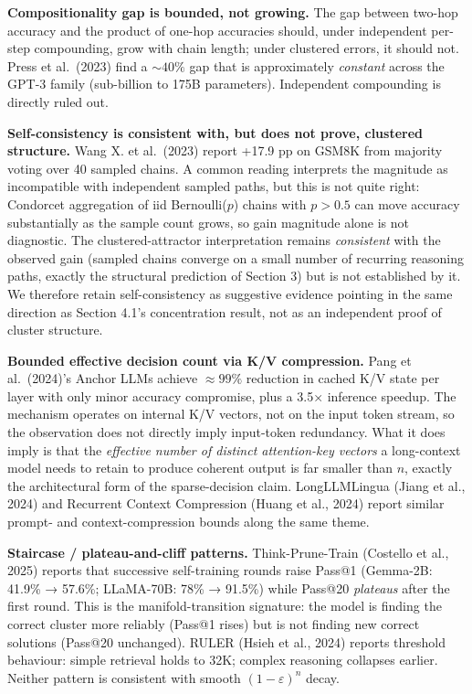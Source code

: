 \documentclass[
]{article}
\begin{document}
\textbf{Compositionality gap is bounded, not growing.} The gap between
two-hop accuracy and the product of one-hop accuracies should, under
independent per-step compounding, grow with chain length; under
clustered errors, it should not. Press et al.~(2023) find a
\(\sim 40\%\) gap that is approximately \emph{constant} across the GPT-3
family (sub-billion to 175B parameters). Independent compounding is
directly ruled out.

\textbf{Self-consistency is consistent with, but does not prove,
clustered structure.} Wang X. et al.~(2023) report +17.9 pp on GSM8K
from majority voting over 40 sampled chains. A common reading interprets
the magnitude as incompatible with independent sampled paths, but this
is not quite right: Condorcet aggregation of iid Bernoulli(\(p\)) chains
with \(p > 0.5\) can move accuracy substantially as the sample count
grows, so gain magnitude alone is not diagnostic. The
clustered-attractor interpretation remains \emph{consistent} with the
observed gain (sampled chains converge on a small number of recurring
reasoning paths, exactly the structural prediction of Section 3) but is
not established by it. We therefore retain self-consistency as
suggestive evidence pointing in the same direction as Section 4.1's
concentration result, not as an independent proof of cluster structure.

\textbf{Bounded effective decision count via K/V compression.} Pang et
al.~(2024)'s Anchor LLMs achieve \(\approx 99\%\) reduction in cached
K/V state per layer with only minor accuracy compromise, plus a 3.5×
inference speedup. The mechanism operates on internal K/V vectors, not
on the input token stream, so the observation does not directly imply
input-token redundancy. What it does imply is that the \emph{effective
number of distinct attention-key vectors} a long-context model needs to
retain to produce coherent output is far smaller than \(n\), exactly the
architectural form of the sparse-decision claim. LongLLMLingua (Jiang et
al., 2024) and Recurrent Context Compression (Huang et al., 2024) report
similar prompt- and context-compression bounds along the same theme.

\textbf{Staircase / plateau-and-cliff patterns.} Think-Prune-Train
(Costello et al., 2025) reports that successive self-training rounds
raise Pass@1 (Gemma-2B: 41.9\% → 57.6\%; LLaMA-70B: 78\% → 91.5\%) while
Pass@20 \emph{plateaus} after the first round. This is the
manifold-transition signature: the model is finding the correct cluster
more reliably (Pass@1 rises) but is not finding new correct solutions
(Pass@20 unchanged). RULER (Hsieh et al., 2024) reports threshold
behaviour: simple retrieval holds to 32K; complex reasoning collapses
earlier. Neither pattern is consistent with smooth
\((1 - \varepsilon)^n\) decay.
\end{document}
